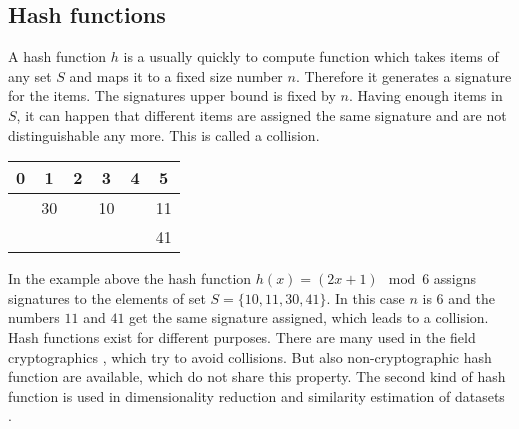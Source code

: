 \subsection{Hash functions}
A hash function $ h $ is a usually quickly to compute function which takes  items of any set $ S $ and maps it to a fixed size number $ n $. Therefore it generates a signature for the items. The signatures upper bound is fixed by $ n $. Having enough items in $ S $, it can happen that different items are assigned the same signature and are not distinguishable any more. This is called a collision.\\

\begin{table}[h!]
    \centering
    \begin{tabular}{| c | c | c | c | c | c |}
        \hline
        0  & 1  & 2  & 3  & 4  & 5  \\
        \hline
           & 30 &    & 10 &    & 11 \\
        \hline
           &    &    &    &    & 41 \\
        \hline
    \end{tabular}   
\end{table}
    
In the example above the hash function $ h(x) = (2x+1) \mod 6 $ assigns signatures to the elements of set $ S = \{ 10,11,30,41 \} $.  In this case $ n $ is $ 6 $ and the numbers $ 11 $ and $ 41 $ get the same signature assigned, which leads to a collision.\\

Hash functions exist for different purposes. There are many used in the field cryptographics \cite{cryptographicHashFunctions}, which try to avoid collisions. But also non-cryptographic hash function are available, which do not share this property. The second kind of hash function is used in dimensionality reduction and similarity estimation of datasets \cite{practicalHashFunctions}.\\